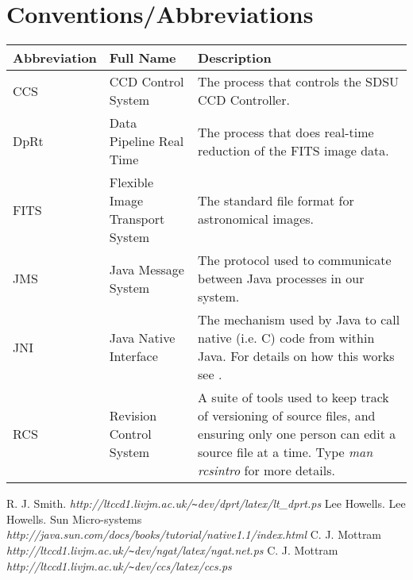 \documentclass[10pt,a4paper]{article}
\begin{document}
\section{Conventions/Abbreviations}
\begin{center}
\begin{tabular}{|l|l|p{25em}|}
\hline
{\bf Abbreviation} & {\bf Full Name} & {\bf Description} \\
\hline
CCS  & CCD Control System      		& The process that controls the SDSU CCD Controller. \\
DpRt & Data Pipeline Real Time 		& The process that does real-time reduction of the FITS image data. \\
FITS & Flexible Image Transport System 	& The standard file format for astronomical images. \\
JMS  & Java Message System     		& The protocol used to communicate between Java processes in our system. \\
JNI  & Java Native Interface   		& The mechanism used by Java to call native (i.e. C) code from within Java. For
details on how this works see \cite{bib:jnitut}. \\
RCS  & Revision Control System		& A suite of tools used to keep track of versioning of source files, and
ensuring only one person can edit a source file at a time. Type {\em man rcsintro} for more details. \\
\hline
\end{tabular}
\end{center}

\begin{thebibliography}{99}
R. J. Smith. {\em http://ltccd1.livjm.ac.uk/\verb'~'dev/dprt/latex/lt\_dprt.ps}
Lee Howells.
Lee Howells.
Sun Micro-systems 
{\em http://java.sun.com/docs/books/tutorial/native1.1/index.html}
C. J. Mottram {\em http://ltccd1.livjm.ac.uk/\verb'~'dev/ngat/latex/ngat.net.ps}
C. J. Mottram {\em http://ltccd1.livjm.ac.uk/\verb'~'dev/ccs/latex/ccs.ps}
\end{thebibliography}
\end{document}

